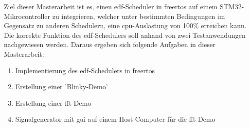 \documentclass[../EDF Master Thesis.tex]{subfiles}
\begin{document}
    Ziel dieser Masterarbeit ist es, einen \ac{edf}-Scheduler in \ac{freertos} auf einem STM32-Mikrocontroller zu integrieren, welcher unter bestimmten Bedingungen im Gegensatz zu anderen Schedulern, eine \ac{cpu}-Auslastung von 100\% erreichen kann.
    Die korrekte Funktion des \ac{edf}-Schedulers soll anhand von zwei Testanwendungen nachgewiesen werden.
    Daraus ergeben sich folgende Aufgaben in dieser Masterarbeit:
    \begin{enumerate}
        \item Implementierung des \ac{edf}-Schedulers in \ac{freertos}
        \item Erstellung einer 'Blinky-Demo'
        \item Erstellung einer \ac{fft}-Demo
        \item Signalgenerator mit \ac{gui} auf einem Host-Computer für die \ac{fft}-Demo
    \end{enumerate}
\end{document}
